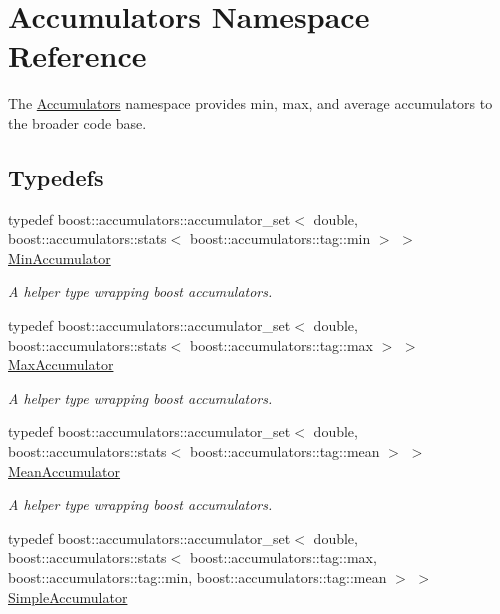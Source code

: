 \hypertarget{namespaceAccumulators}{}\section{Accumulators Namespace Reference}
\label{namespaceAccumulators}


The \hyperlink{namespaceAccumulators}{Accumulators} namespace provides min, max, and average accumulators to the broader code base.  


\subsection*{Typedefs}
\begin{DoxyCompactItemize}
\item 
typedef boost\+::accumulators\+::accumulator\+\_\+set$<$ double, boost\+::accumulators\+::stats$<$ boost\+::accumulators\+::tag\+::min $>$ $>$ \hyperlink{namespaceAccumulators_a475b123bb5929d13a2f78b40f43a1257}{Min\+Accumulator}
\begin{DoxyCompactList}\small\item\em A helper type wrapping boost accumulators. \end{DoxyCompactList}\item 
typedef boost\+::accumulators\+::accumulator\+\_\+set$<$ double, boost\+::accumulators\+::stats$<$ boost\+::accumulators\+::tag\+::max $>$ $>$ \hyperlink{namespaceAccumulators_ae68012df9b3c9adaca0807437b8b0129}{Max\+Accumulator}
\begin{DoxyCompactList}\small\item\em A helper type wrapping boost accumulators. \end{DoxyCompactList}\item 
typedef boost\+::accumulators\+::accumulator\+\_\+set$<$ double, boost\+::accumulators\+::stats$<$ boost\+::accumulators\+::tag\+::mean $>$ $>$ \hyperlink{namespaceAccumulators_a42d249e1cf4e4f6c496ab61b7372cf4a}{Mean\+Accumulator}
\begin{DoxyCompactList}\small\item\em A helper type wrapping boost accumulators. \end{DoxyCompactList}\item 
typedef boost\+::accumulators\+::accumulator\+\_\+set$<$ double, boost\+::accumulators\+::stats$<$ boost\+::accumulators\+::tag\+::max, boost\+::accumulators\+::tag\+::min, boost\+::accumulators\+::tag\+::mean $>$ $>$ \hyperlink{namespaceAccumulators_aed31f3acda76edc1d58c2bcb479a7aec}{Simple\+Accumulator}

\end{DoxyCompactItemize}
